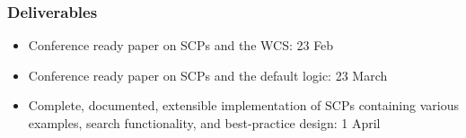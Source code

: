 \documentclass{article}
\begin{document}
\subsubsection*{Deliverables}
\begin{itemize}
\item Conference ready paper on SCPs and the WCS: 23 Feb
\item Conference ready paper on SCPs and the default logic: 23 March
\item Complete, documented, extensible implementation of SCPs containing various examples, search functionality, and best-practice design: 1 April
\end{itemize}
	


\end{document}
